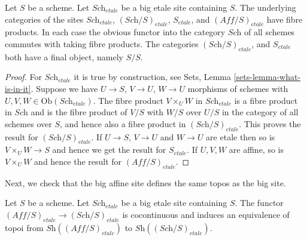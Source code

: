 \begin{lemma}
\label{lemma-fibre-products-etale}
Let $S$ be a scheme. Let $\textit{Sch}_{etale}$ be a big etale
site containing $S$. The underlying categories of the sites
$\textit{Sch}_{etale}$, $(\textit{Sch}/S)_{etale}$,
$S_{etale}$, and $(\textit{Aff}/S)_{etale}$ have fibre products.
In each case the obvious functor into the category $\textit{Sch}$ of
all schemes commutes with taking fibre products. The categories
$(\textit{Sch}/S)_{etale}$, and $S_{etale}$ both have a final object,
namely $S/S$.
\end{lemma}

\begin{proof}
For $\textit{Sch}_{etale}$ it is true by construction, see
Sets, Lemma \ref{sets-lemma-what-is-in-it}.
Suppose we have $U \to S$, $V \to U$, $W \to U$ morphisms
of schemes with $U, V, W \in \text{Ob}(\textit{Sch}_{etale})$.
The fibre product $V \times_U W$ in $\textit{Sch}_{etale}$
is a fibre product in $\textit{Sch}$ and
is the fibre product of $V/S$ with $W/S$ over $U/S$ in
the category of all schemes over $S$, and hence also a
fibre product in $(\textit{Sch}/S)_{etale}$.
This proves the result for $(\textit{Sch}/S)_{etale}$.
If $U \to S$, $V \to U$ and $W \to U$ are etale then so is
$V \times_U W \to S$ and hence we get the result for $S_{etale}$.
If $U, V, W$ are affine, so is $V \times_U W$ and hence the
result for $(\textit{Aff}/S)_{etale}$.
\end{proof}

\noindent
Next, we check that the big affine site defines the same
topos as the big site.

\begin{lemma}
\label{lemma-affine-big-site-etale}
Let $S$ be a scheme. Let $\textit{Sch}_{etale}$ be a big etale
site containing $S$.
The functor $(\textit{Aff}/S)_{etale} \to (\textit{Sch}/S)_{etale}$
is cocontinuous and induces an equivalence of topoi from
$\textit{Sh}((\textit{Aff}/S)_{etale})$ to
$\textit{Sh}((\textit{Sch}/S)_{etale})$.
\end{lemma}

